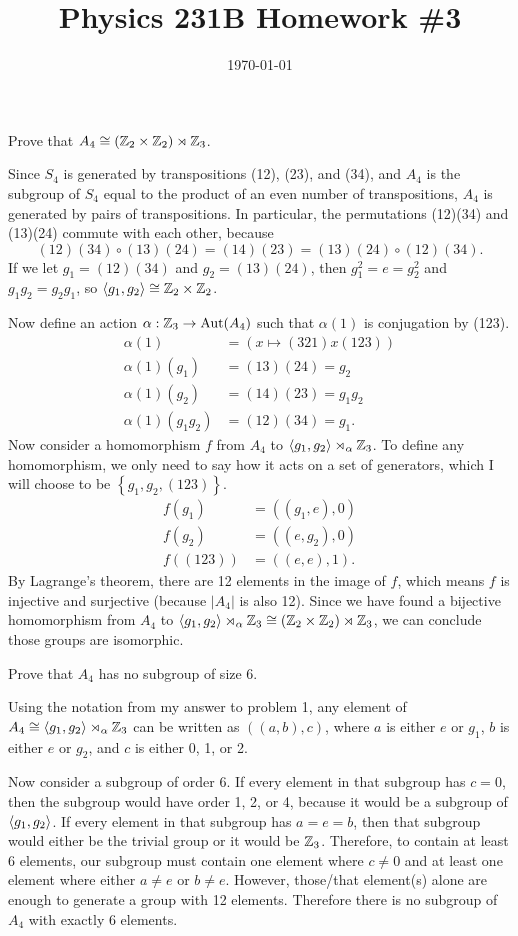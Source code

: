 \documentclass{article}
\date{\today}
\title{Physics 231B Homework \#3}
\begin{document}
\maketitle

\bigskip
\begin{prob}
    Prove that $A_4 \cong (\mathbb{Z}_2 \times \mathbb{Z}_2) \rtimes \mathbb{Z}_3$.
\end{prob}
Since $S_4$ is generated by transpositions (12), (23), and (34), and $A_4$ is the subgroup of $S_4$ equal to the product of an even number of transpositions, $A_4$ is generated by pairs of transpositions. In particular, the permutations (12)(34) and (13)(24) commute with each other, because
\[ (12)(34) \circ (13)(24) = (14)(23) = (13)(24) \circ (12)(34). \]
If we let $g_1 = (12)(34)$ and $g_2 = (13)(24)$, then $g_1^2=e=g_2^2$ and $g_1g_2=g_2g_1$, so $\left\langle g_1, g_2 \right\rangle \cong \mathbb{Z}_2 \times \mathbb{Z}_2$.
\par
Now define an action $\alpha: \mathbb{Z}_3 \rightarrow \operatorname{Aut}(A_4)$ such that $\alpha(1)$ is conjugation by (123).
\begin{align*}
\alpha(1) &= \left( x \mapsto (321)x(123) \right) \\
\alpha(1)(g_1) &= (13)(24) = g_2 \\
\alpha(1)(g_2) &= (14)(23) = g_1g_2 \\
\alpha(1)(g_1g_2) &= (12)(34) = g_1.
\end{align*}
Now consider a homomorphism $f$ from $A_4$ to $ \left\langle g_1, g_2 \right\rangle \rtimes_\alpha \mathbb{Z}_3$. To define any homomorphism, we only need to say how it acts on a set of generators, which I will choose to be $ \left\{ g_1, g_2, (123) \right\}$.
\begin{align*}
    f(g_1) &= ((g_1, e), 0) \\
    f(g_2) &= ((e, g_2), 0) \\
    f((123)) &= ((e,e), 1).
\end{align*}
By Lagrange's theorem, there are 12 elements in the image of $f$, which means $f$ is injective and surjective (because $|A_4|$ is also 12). Since we have found a bijective homomorphism from $A_4$ to $\left\langle g_1,g_2 \right\rangle \rtimes_\alpha \mathbb{Z}_3 \cong (\mathbb{Z}_2 \times \mathbb{Z}_2) \rtimes \mathbb{Z}_3$, we can conclude those groups are isomorphic.

\bigskip
\begin{prob}
    Prove that $A_4$ has no subgroup of size 6.
\end{prob}
Using the notation from my answer to problem 1, any element of $A_4 \cong \left\langle g_1, g_2 \right\rangle \rtimes_\alpha \mathbb{Z}_3$ can be written as $((a,b),c)$, where $a$ is either $e$ or $g_1$, $b$ is either $e$ or $g_2$, and $c$ is either 0, 1, or 2.
\par
Now consider a subgroup of order 6. If every element in that subgroup has $c=0$, then the subgroup would have order 1, 2, or 4, because it would be a subgroup of $\left\langle g_1, g_2 \right\rangle$. If every element in that subgroup has $a=e=b$, then that subgroup would either be the trivial group or it would be $\mathbb{Z}_3$. Therefore, to contain at least 6 elements, our subgroup must contain one element where $c \neq 0$ and at least one element where either $a \neq e$ or $b \neq e$. However, those/that element(s) alone are enough to generate a group with 12 elements. Therefore there is no subgroup of $A_4$ with exactly 6 elements.
\end{document}
